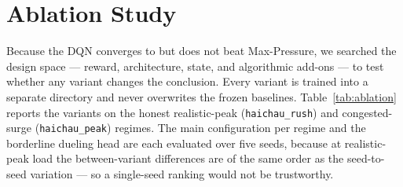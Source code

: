 \section{Ablation Study}
\label{sec:ablation}

Because the DQN converges to but does not beat Max-Pressure, we searched the design space ---
reward, architecture, state, and algorithmic add-ons --- to test whether any variant changes the
conclusion. Every variant is trained into a separate directory and never overwrites the frozen
baselines. Table~\ref{tab:ablation} reports the variants on the honest realistic-peak
(\texttt{haichau\_rush}) and congested-surge (\texttt{haichau\_peak}) regimes. The main
configuration per regime and the borderline dueling head are each evaluated over five seeds,
because at realistic-peak load the between-variant differences are of the same order as the
seed-to-seed variation --- so a single-seed ranking would not be trustworthy.


